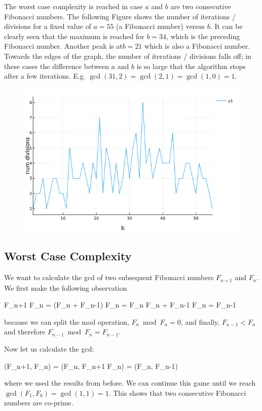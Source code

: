 The worst case complexity is reached in case $a$ and $b$ are two consecutive Fibonacci numbers. The following Figure shows the number of iterations / divisions  for a fixed value of $a=55$ (a Fibonacci number) versus $b$. It can be clearly seen that the maximum is reached for $b=34$, which is the preceding Fibonacci number. Another peak is at$b=21$ which is also a Fibonacci number. Towards the edges of the graph, the number of iterations / divisions falls off; in these cases the difference between $a$ and $b$ is so large that the algorithm stops after a few iterations. E.g. $\gcd(31,2) = \gcd(2,1) = \gcd(1,0) = 1$.


\begin{figure}[H]
	\includegraphics[scale=0.5]{images/gcd_num_div.png}
\end{figure}


\subsection{Worst Case Complexity}

We want to calculate the gcd of two subsequent Fibonacci numbers $F_{n+1}$ and $F_n$. We first make the following observation

\bee
F_{n+1} \bmod F_n = (F_n + F_{n-1}) \bmod F_n = F_n \bmod F_n + F_{n-1} \bmod F_n = F_{n-1}
\eee

because we can split the mod operation, $F_n \bmod F_n = 0$, and finally, $F_{n-1} < F_n$ and therefore $F_{n-1} \bmod F_n = F_{n-1}$.

Now let us calculate the gcd:

\bee
\gcd(F_{n+1}, F_n) = \gcd(F_n, F_{n+1} \bmod F_n) = \gcd(F_n, F_{n-1})
\eee

where we used the results from before. We can continue this game until we reach $\gcd(F_1, F_0) = \gcd(1,1) = 1$. This shows that two consecutive Fibonacci numbers are co-prime.